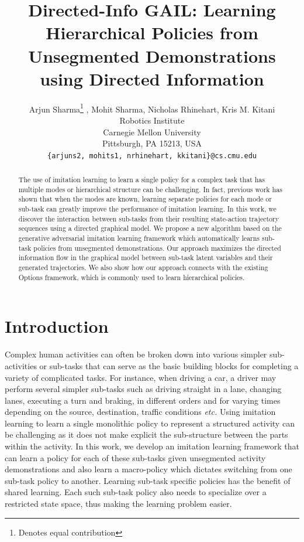 \documentclass{article} %
\title{Directed-Info GAIL: Learning Hierarchical Policies from Unsegmented Demonstrations using Directed Information}
\author{Arjun Sharma\thanks{Denotes equal contribution} , Mohit Sharma\footnotemark[1]  , Nicholas Rhinehart,  Kris M. Kitani  \\
Robotics Institute \\
Carnegie Mellon University \\
Pittsburgh, PA 15213, USA \\
\texttt{\{arjuns2, mohits1, nrhinehart, kkitani\}@cs.cmu.edu} \\
}
\begin{document}
\maketitle

\begin{abstract}
The use of imitation learning to learn a single policy for a complex task that has multiple modes or hierarchical structure can be challenging. In fact, previous work has shown that when the modes are known, learning separate policies for each mode or sub-task can greatly improve the performance of imitation learning. In this work, we discover the interaction between sub-tasks from their resulting state-action trajectory sequences using a directed graphical model. We propose a new algorithm based on the generative adversarial imitation learning framework which automatically learns sub-task policies from unsegmented demonstrations. Our approach maximizes the directed information flow in the graphical model between sub-task latent variables and their generated trajectories. We also show how our approach connects with the existing Options framework, which is commonly used to learn hierarchical policies. %
\end{abstract}


\section{Introduction}

Complex human activities can often be broken down into various simpler sub-activities or sub-tasks that can serve as the basic building blocks for completing a variety of complicated tasks. For instance, when driving a car, a driver may perform several simpler sub-tasks such as driving straight in a lane, changing lanes, executing a turn and braking, in different orders and for varying times depending on the source, destination, traffic conditions \emph{etc.} Using imitation learning to learn a single monolithic policy to represent a structured activity can be challenging as it does not make explicit the sub-structure between the parts within the activity. In this work, we develop an imitation learning framework that can learn a policy for each of these sub-tasks given unsegmented activity demonstrations and also learn a macro-policy which dictates switching from one sub-task policy to another. Learning sub-task specific policies has the benefit of shared learning. Each such sub-task policy also needs to specialize over a restricted state space, thus making the learning problem easier.
\end{document}
